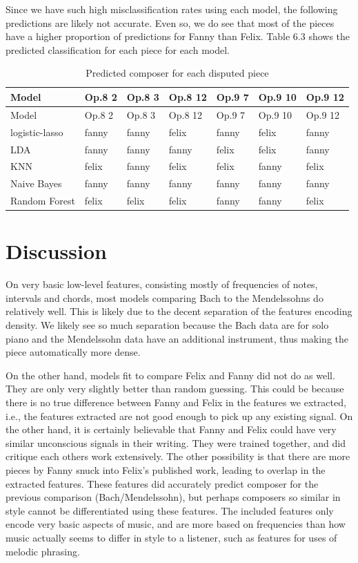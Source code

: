 \documentclass[12pt,twoside]{reedthesis}
\theoremstyle{definition}
\theoremstyle{definition}
\theoremstyle{definition}
\theoremstyle{remark}
\begin{document}
Since we have such high misclassification rates using each model, the
following predictions are likely not accurate. Even so, we do see that
most of the pieces have a higher proportion of predictions for Fanny
than Felix. Table 6.3 shows the predicted classification for each piece
for each model.
\begin{longtable}[]{@{}lllllll@{}}
\caption{Predicted composer for each disputed piece}\tabularnewline
\toprule
Model & Op.8 2 & Op.8 3 & Op.8 12 & Op.9 7 & Op.9 10 & Op.9
12\tabularnewline
\midrule
\endfirsthead
\toprule
Model & Op.8 2 & Op.8 3 & Op.8 12 & Op.9 7 & Op.9 10 & Op.9
12\tabularnewline
\midrule
\endhead
logistic-lasso & fanny & fanny & felix & fanny & felix &
fanny\tabularnewline
LDA & fanny & fanny & fanny & felix & felix & fanny\tabularnewline
KNN & felix & fanny & felix & felix & fanny & felix\tabularnewline
Naive Bayes & fanny & fanny & fanny & fanny & fanny &
fanny\tabularnewline
Random Forest & felix & felix & felix & fanny & fanny &
felix\tabularnewline
\bottomrule
\end{longtable}
\section{Discussion}\label{discussion}

On very basic low-level features, consisting mostly of frequencies of
notes, intervals and chords, most models comparing Bach to the
Mendelssohns do relatively well. This is likely due to the decent
separation of the features encoding density. We likely see so much
separation because the Bach data are for solo piano and the Mendelssohn
data have an additional instrument, thus making the piece automatically
more dense.

On the other hand, models fit to compare Felix and Fanny did not do as
well. They are only very slightly better than random guessing. This
could be because there is no true difference between Fanny and Felix in
the features we extracted, i.e., the features extracted are not good
enough to pick up any existing signal. On the other hand, it is
certainly believable that Fanny and Felix could have very similar
unconscious signals in their writing. They were trained together, and
did critique each others work extensively. The other possibility is that
there are more pieces by Fanny snuck into Felix's published work,
leading to overlap in the extracted features. These features did
accurately predict composer for the previous comparison
(Bach/Mendelssohn), but perhaps composers so similar in style cannot be
differentiated using these features. The included features only encode
very basic aspects of music, and are more based on frequencies than how
music actually seems to differ in style to a listener, such as features
for uses of melodic phrasing.
\end{document}
